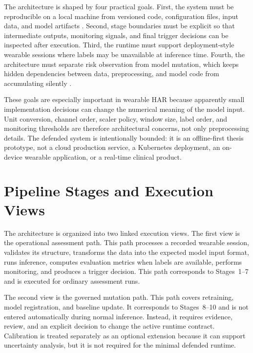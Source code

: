 The architecture is shaped by four practical goals. First, the system must be reproducible on a local machine from versioned code, configuration files, input data, and model artifacts \cite{gardner2018enabling,bahaidarah2021reusable}. Second, stage boundaries must be explicit so that intermediate outputs, monitoring signals, and final trigger decisions can be inspected after execution. Third, the runtime must support deployment-style wearable sessions where labels may be unavailable at inference time. Fourth, the architecture must separate risk observation from model mutation, which keeps hidden dependencies between data, preprocessing, and model code from accumulating silently \cite{sculley2015debt}.

These goals are especially important in wearable HAR because apparently small implementation decisions can change the numerical meaning of the model input. Unit conversion, channel order, scaler policy, window size, label order, and monitoring thresholds are therefore architectural concerns, not only preprocessing details. The defended system is intentionally bounded: it is an offline-first thesis prototype, not a cloud production service, a Kubernetes deployment, an on-device wearable application, or a real-time clinical product.

\section{Pipeline Stages and Execution Views}
\label{sec:pipeline_execution_views}

The architecture is organized into two linked execution views. The first view is the operational assessment path. This path processes a recorded wearable session, validates its structure, transforms the data into the expected model input format, runs inference, computes evaluation metrics when labels are available, performs monitoring, and produces a trigger decision. This path corresponds to Stages~1--7 and is executed for ordinary assessment runs.

The second view is the governed mutation path. This path covers retraining, model registration, and baseline update. It corresponds to Stages~8--10 and is not entered automatically during normal inference. Instead, it requires evidence, review, and an explicit decision to change the active runtime contract. Calibration is treated separately as an optional extension because it can support uncertainty analysis, but it is not required for the minimal defended runtime.

